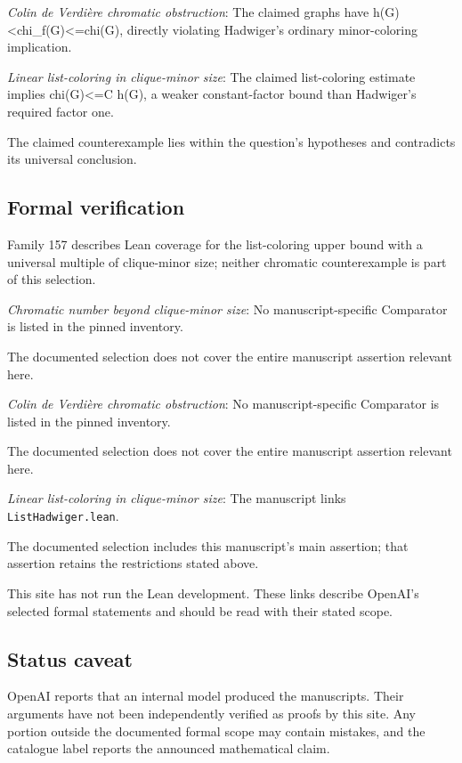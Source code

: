 \documentclass[11pt]{article}
\begin{document}
\textit{Colin de Verdière chromatic obstruction}: The claimed graphs have h(G)<chi\_f(G)<=chi(G), directly violating Hadwiger’s ordinary minor-coloring implication.

\textit{Linear list-coloring in clique-minor size}: The claimed list-coloring estimate implies chi(G)<=C h(G), a weaker constant-factor bound than Hadwiger’s required factor one.

The claimed counterexample lies within the question’s hypotheses and contradicts its universal conclusion.

\subsection{Formal verification}
Family 157 describes Lean coverage for the list-coloring upper bound with a universal multiple of clique-minor size; neither chromatic counterexample is part of this selection.

\textit{Chromatic number beyond clique-minor size}: No manuscript-specific Comparator is listed in the pinned inventory.

The documented selection does not cover the entire manuscript assertion relevant here.

\textit{Colin de Verdière chromatic obstruction}: No manuscript-specific Comparator is listed in the pinned inventory.

The documented selection does not cover the entire manuscript assertion relevant here.

\textit{Linear list-coloring in clique-minor size}: The manuscript links \texttt{ListHadwiger.lean}.

The documented selection includes this manuscript’s main assertion; that assertion retains the restrictions stated above.

This site has not run the Lean development. These links describe OpenAI’s selected formal statements and should be read with their stated scope.

\subsection{Status caveat}
OpenAI reports that an internal model produced the manuscripts. Their arguments have not been independently verified as proofs by this site. Any portion outside the documented formal scope may contain mistakes, and the catalogue label reports the announced mathematical claim.
\end{document}
